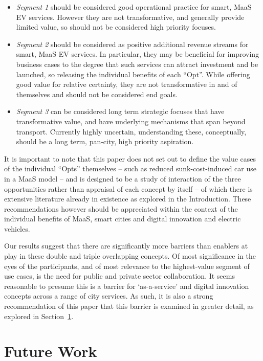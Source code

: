 \documentclass[journal]{IEEEtran}
\begin{document}
\begin{itemize}
\item {\emph{Segment 1}} should be considered good operational practice for
  smart, MaaS EV services. However they are not transformative, and
  generally provide limited value, so should not be considered high
  priority focuses. 
\item {\emph{Segment 2}} should be considered as positive additional revenue
  streams for smart, MaaS EV services. In particular, they may be
  beneficial for improving business cases to the degree that such
  services can attract investment and be launched, so releasing the
  individual benefits of each ``Opt''. While offering good value for
  relative certainty, they are not transformative in and of themselves
  and should not be considered end goals.
\item {\emph{Segment 3}} can be considered long term strategic focuses that
  have transformative value, and have underlying mechanisms that span
  beyond transport. Currently highly uncertain, understanding these,
  conceptually, should be a long term, pan-city, high priority
  aspiration.
\end{itemize}

It is important to note that this paper does not set out to define the
value cases of the individual ``Opts'' themselves -- such as reduced
sunk-cost-induced car use in a MaaS model -- and is designed to be a
study of interaction of the three opportunities rather than appraisal
of each concept by itself -- of which there is extensive literature
already in existence as explored in the Introduction. These
recommendations however should be appreciated within the context of
the individual benefits of MaaS, smart cities and digital innovation
and electric vehicles.

Our results suggest that there are significantly more barriers than
enablers at play in these double and triple overlapping concepts. Of
most significance in the eyes of the participants, and of most
relevance to the highest-value segment of use cases, is the need for
public and private sector collaboration. It seems reasonable to
presume this is a barrier for `as-a-service' and digital innovation
concepts across a range of city services. As such, it is also a strong
recommendation of this paper that this barrier is examined in greater
detail, as explored in Section~\ref{future}.


\section{Future Work}\label{future}
\end{document}

